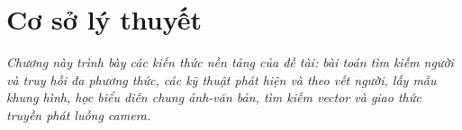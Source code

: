 \chapter{Cơ sở lý thuyết}
\label{chapter:lythuyet}

\textit{Chương này trình bày các kiến thức nền tảng của đề tài: bài toán tìm kiếm người và truy hồi đa phương thức, các kỹ thuật phát hiện và theo vết người, lấy mẫu khung hình, học biểu diễn chung ảnh-văn bản, tìm kiếm vector và giao thức truyền phát luồng camera.}








